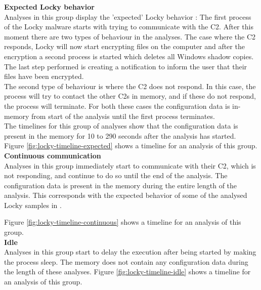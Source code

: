 \documentclass[conference]{IEEEtran}
\begin{document}
\textbf{Expected Locky behavior}
\\Analyses in this group display the 'expected' Locky behavior \cite{nelson-locky}: The first process of the Locky malware starts with trying to communicate with the \Gls{C2}. After this moment there are two types of behaviour in the analyses. The case where the \Gls{C2} responds, Locky will now start encrypting files on the computer and after the encryption a second process is started which deletes all Windows shadow copies. The last step performed is creating a notification to inform the user that their files have been encrypted.\\

The second type of behaviour is where the \Gls{C2} does not respond. In this case, the process will try to contact the other \Gls{C2}s in memory, and if these do not respond, the process will terminate. For both these cases the configuration data is in-memory from start of the analysis until the first process terminates.\\

The timelines for this group of analyses show that the \Gls{configuration data} is present in the memory for 10 to 290 seconds after the analysis has started.\\

Figure \ref{fig:locky-timeline-expected} shows a timeline for an analysis of this group.\\

\textbf{Continuous communication }\\
Analyses in this group immediately start to communicate with their \Gls{C2}, which is not responding, and continue to do so until the end of the analysis. The \Gls{configuration data} is present in the memory during the entire length of the analysis. This corresponds with the expected behavior of some of the analysed Locky samples in \cite{nelson-locky}.

Figure \ref{fig:locky-timeline-continuous} shows a timeline for an analysis of this group.\\
 
\textbf{Idle}\\
Analyses in this group start to delay the execution after being started by making the process sleep. The memory does not contain any \Gls{configuration data} during the length of these analyses. Figure \ref{fig:locky-timeline-idle} shows a timeline for an analysis of this group.\\
\end{document}
